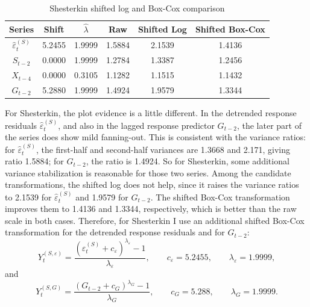 \documentclass[
  10pt,
]{extarticle}
\begin{document}
\begin{center}
\small
\begin{table}[H]

\caption{\label{tab:pproj-shesterkin-transform-table}Shesterkin shifted log and Box-Cox comparison}
\centering
\begin{tabular}[t]{cccccc}
\toprule
Series & Shift & $\hat{\lambda}$ & Raw & Shifted Log & Shifted Box-Cox\\
\midrule
$\widehat{\varepsilon}^{(S)}_t$ & 5.2455 & 1.9999 & 1.5884 & 2.1539 & 1.4136\\
$S_{t-2}$ & 0.0000 & 1.9999 & 1.2784 & 1.3387 & 1.2456\\
$X_{t-4}$ & 0.0000 & 0.3105 & 1.1282 & 1.1515 & 1.1432\\
$G_{t-2}$ & 5.2880 & 1.9999 & 1.4924 & 1.9579 & 1.3344\\
\bottomrule
\end{tabular}
\end{table}
\normalsize
\end{center}

For Shesterkin, the plot evidence is a little different. In the detrended response residuals \(\widehat{\varepsilon}^{(S)}_t\), and also in the lagged response predictor \(G_{t-2}\), the later part of the series does show mild fanning-out. This is consistent with the variance ratios: for \(\widehat{\varepsilon}^{(S)}_t\), the first-half and second-half variances are 1.3668 and 2.171, giving ratio 1.5884; for \(G_{t-2}\), the ratio is 1.4924. So for Shesterkin, some additional variance stabilization is reasonable for those two series. Among the candidate transformations, the shifted log does not help, since it raises the variance ratios to 2.1539 for \(\widehat{\varepsilon}^{(S)}_t\) and 1.9579 for \(G_{t-2}\). The shifted Box-Cox transformation improves them to 1.4136 and 1.3344, respectively, which is better than the raw scale in both cases. Therefore, for Shesterkin I use an additional shifted Box-Cox transformation for the detrended response residuals and for \(G_{t-2}\):
\[
Y^{(S,\varepsilon)}_t
= \frac{\left(\widehat{\varepsilon}^{(S)}_t + c_{\varepsilon}\right)^{\lambda_{\varepsilon}} - 1}{\lambda_{\varepsilon}},
\qquad
c_{\varepsilon} = 5.2455,
\qquad
\lambda_{\varepsilon} = 1.9999,
\]
and
\[
Y^{(S,G)}_t
= \frac{\left(G_{t-2} + c_G\right)^{\lambda_G} - 1}{\lambda_G},
\qquad
c_G = 5.288,
\qquad
\lambda_G = 1.9999.
\]
\end{document}
